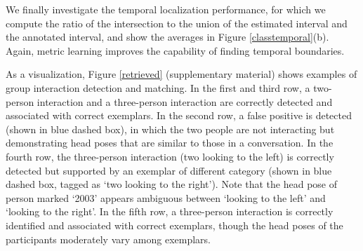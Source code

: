 We finally investigate the temporal localization performance, for which we compute the ratio of the intersection to the union of the estimated interval and the annotated interval, and show the averages in Figure \ref{classtemporal}(b).  Again, metric learning improves the capability of finding temporal boundaries.

As a visualization, Figure \ref{retrieved} (supplementary material) shows examples of group interaction detection and matching. In the first and third row, a two-person interaction and a three-person interaction are correctly detected and associated with correct exemplars. In the second row, a false positive is detected (shown in blue dashed box), in which the two people are not interacting but demonstrating head poses that are similar to those in a conversation. In the fourth row, the three-person interaction (two looking to the left) is correctly detected but supported by an exemplar of different category (shown in blue dashed box, tagged as `two looking to the right'). Note that the head pose of person marked `2003' appears ambiguous between `looking to the left' and `looking to the right'. In the fifth row, a three-person interaction is correctly identified and associated with correct exemplars, though the head poses of the participants moderately vary among exemplars. 

\vspace{0.05in}
